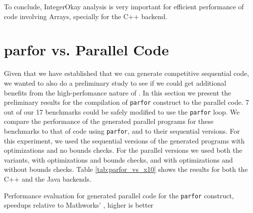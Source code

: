 To conclude, IntegerOkay analysis is very important for efficient performance of
code involving Arrays, specially for the \xten C++ backend.

\section{\matlab parfor vs. \mixten Parallel Code}
\label{sec:parfor_results}
 
Given that we have established that we can generate competitive
sequential code, we wanted to also do a preliminary study to see if we
could get additional benefits from the high-perfomance nature of \xten.
In this section we present the preliminary results for the
compilation of \matlab \texttt{parfor} construct to the parallel \xten
code. 7 out of our 17 benchmarks could be safely modified to use the
\texttt{parfor} loop.  We compare the performance of the generated
parallel \xten programs for these benchmarks to that of \matlab code
using \texttt{parfor}, and to their sequential \xten versions. For this
experiment, we used the sequential versions of the generated \xten
programs with optimizations and no bounds checks.  For the parallel
versions we used both the variants, with optimizations and bounds
checks, and with optimizations and without bounds checks.  Table
\ref{tab:parfor_vs_x10} shows the results for both the \xten C++ and the
\xten Java backends.
   
\begin{table}[htbp]
\begin{center} 
\scalebox{0.7}{
 
}
\caption{Performance evaluation for \mixten generated
parallel \xten code for the \matlab \texttt{parfor} construct, speedups
relative to Mathworks' \matlab,  higher is better} 
\label{tab:parfor_vs_x10} 
\end{center} 
\end{table}

